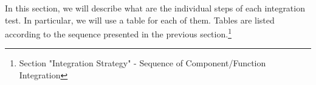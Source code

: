 In this section, we will describe what are the individual steps of each integration test. In particular, we will use a table for each of them. \newline
Tables are listed according to the sequence presented in the previous section.\footnote{Section "Integration Strategy" - Sequence of Component/Function Integration}



